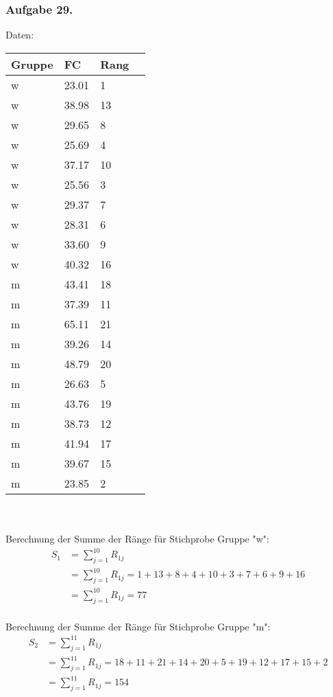 \documentclass[a4paper,12pt]{article}
\newcommand{\ex}[1]{\newpage\subsubsection*{Aufgabe #1.}}
\begin{document}
	
	


\ex{29}

Daten:\\

\begin{tabular}{ | l | l | l | p{5cm} |}
	\hline
	Gruppe & FC & Rang  \\ \hline
	w & 23.01 & 1 \\ \hline
	w & 38.98 & 13  \\ \hline
	w & 29.65 & 8 \\ \hline
	w & 25.69 & 4 \\ \hline
	w & 37.17 & 10  \\ \hline
	w & 25.56 & 3 \\ \hline
	w & 29.37 & 7 \\ \hline
	w & 28.31 & 6  \\ \hline
	w & 33.60 & 9 \\ \hline
	w & 40.32 & 16 \\ \hline
	m & 43.41 & 18  \\ \hline
	m & 37.39 & 11 \\ \hline
	m & 65.11 & 21 \\ \hline
	m & 39.26 & 14  \\ \hline
	m & 48.79 & 20 \\ \hline
	m & 26.63 & 5 \\ \hline
	m & 43.76 & 19  \\ \hline
	m & 38.73 & 12 \\ \hline
	m & 41.94 & 17 \\ \hline
	m & 39.67 & 15  \\ \hline
	m & 23.85 & 2 \\ \hline
\end{tabular}
\\\\
Berechnung der Summe der Ränge für Stichprobe Gruppe "w":
\begin{align*}
S_1 
&= \sum_{j=1}^{10} R_{1j} \\
&= \sum_{j=1}^{10} R_{1j} = 1+13+8+4+10+3+7+6+9+16 \\
&= \sum_{j=1}^{10} R_{1j} = 77	\\
\end{align*}

Berechnung der Summe der Ränge für Stichprobe Gruppe "m":
\begin{align*}
S_2 
&= \sum_{j=1}^{11} R_{1j} \\
&= \sum_{j=1}^{11} R_{1j} = 18+11+21+14+20+5+19+12+17+15+2 \\
&= \sum_{j=1}^{11} R_{1j} = 154	\\
\end{align*}
\end{document}
